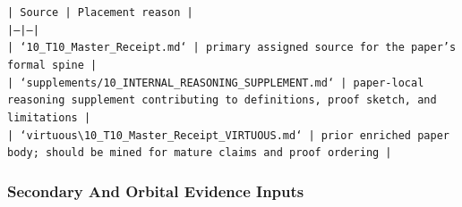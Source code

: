 \documentclass[11pt]{article}
\begin{document}
\noindent\texttt{| Source | Placement reason |}\\
\noindent\texttt{|---|---|}\\
\noindent\texttt{| `10\_T10\_Master\_Receipt.md` | primary assigned source for the paper's formal spine |}\\
\noindent\texttt{| `supplements/10\_INTERNAL\_REASONING\_SUPPLEMENT.md` | paper-local reasoning supplement contributing to definitions, proof sketch, and limitations |}\\
\noindent\texttt{| `virtuous\textbackslash{}10\_T10\_Master\_Receipt\_VIRTUOUS.md` | prior enriched paper body; should be mined for mature claims and proof ordering |}\\

\subsubsection*{Secondary And Orbital Evidence Inputs}
\end{document}
